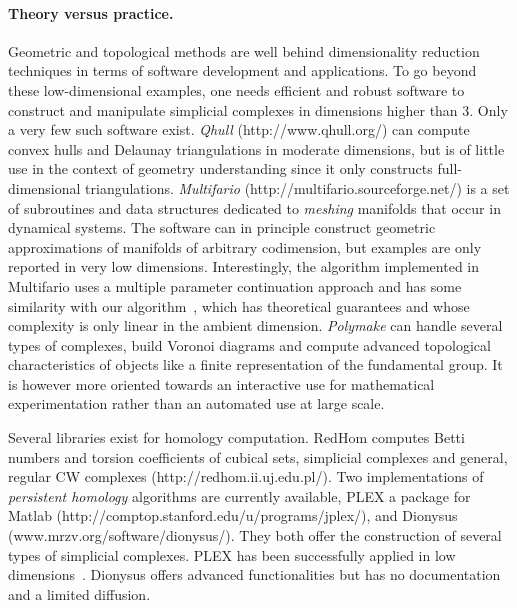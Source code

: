 \paragraph{Theory versus practice.} 
Geometric and topological methods are well behind dimensionality reduction techniques in terms of 
software development and applications.  
%
%
To go beyond these low-dimensional examples, one needs efficient and robust software to construct and manipulate simplicial complexes in dimensions higher than 3.  Only a very few such software exist.  {\em Qhull} (http://www.qhull.org/) can compute convex hulls and Delaunay triangulations in moderate dimensions, but is of little use in the context of geometry understanding since it only constructs full-dimensional triangulations. {\em Multifario} (http://multifario.sourceforge.net/) is a set of subroutines and data structures dedicated to {\em meshing} manifolds that occur in dynamical systems. The software can in principle construct geometric approximations of manifolds of arbitrary codimension, but examples are only reported in very low dimensions. Interestingly, the algorithm implemented in Multifario  uses a multiple parameter continuation approach and has some similarity with our algorithm~\cite{boissonnat2010meshing}, which has theoretical guarantees and whose complexity is only linear in the ambient dimension.  {\em Polymake} can handle several types of complexes, build Voronoi diagrams and compute advanced topological characteristics of objects like a finite representation of the fundamental group. It is however more oriented towards an interactive use for mathematical experimentation
rather than  an automated use at large scale.%

Several libraries exist for homology computation. RedHom computes Betti numbers and torsion coefficients of cubical sets, simplicial complexes and general, regular CW complexes (http://redhom.ii.uj.edu.pl/).
Two implementations of {\em persistent homology} algorithms are currently available, PLEX a package for Matlab (http://comptop.stanford.edu/u/programs/jplex/), and  Dionysus (www.mrzv.org/software/dionysus/). They both offer the construction of several types of simplicial complexes. PLEX has been  successfully applied in low dimensions~\cite{fpgo-airc-2009,rg-bptd-2008,mtcw-tco-2010}. Dionysus offers advanced
functionalities but has no documentation and a limited diffusion.
\vspace{2mm}

